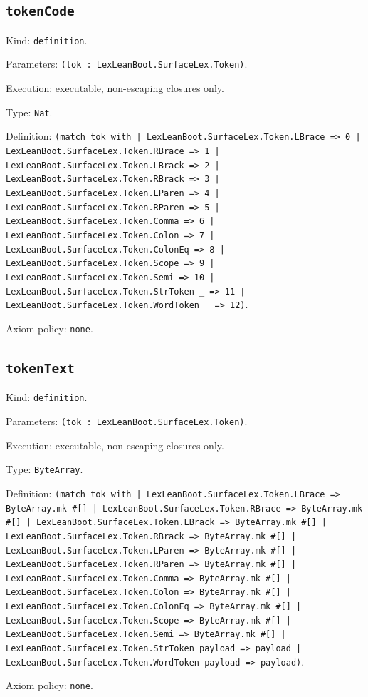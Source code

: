 \documentclass[11pt]{article}
\begin{document}
\subsection*{\texttt{tokenCode}}
\noindent Kind: \texttt{definition}.\par
\noindent Parameters: \texttt{(tok : LexLeanBoot.SurfaceLex.Token)}.\par
\noindent Execution: executable, non-escaping closures only.\par
\noindent Type: \texttt{Nat}.\par
\noindent Definition: \texttt{(match tok with | LexLeanBoot.SurfaceLex.Token.LBrace => 0 | LexLeanBoot.SurfaceLex.Token.RBrace => 1 | LexLeanBoot.SurfaceLex.Token.LBrack => 2 | LexLeanBoot.SurfaceLex.Token.RBrack => 3 | LexLeanBoot.SurfaceLex.Token.LParen => 4 | LexLeanBoot.SurfaceLex.Token.RParen => 5 | LexLeanBoot.SurfaceLex.Token.Comma => 6 | LexLeanBoot.SurfaceLex.Token.Colon => 7 | LexLeanBoot.SurfaceLex.Token.ColonEq => 8 | LexLeanBoot.SurfaceLex.Token.Scope => 9 | LexLeanBoot.SurfaceLex.Token.Semi => 10 | LexLeanBoot.SurfaceLex.Token.StrToken \_ => 11 | LexLeanBoot.SurfaceLex.Token.WordToken \_ => 12)}.\par
\noindent Axiom policy: \texttt{none}.\par
\subsection*{\texttt{tokenText}}
\noindent Kind: \texttt{definition}.\par
\noindent Parameters: \texttt{(tok : LexLeanBoot.SurfaceLex.Token)}.\par
\noindent Execution: executable, non-escaping closures only.\par
\noindent Type: \texttt{ByteArray}.\par
\noindent Definition: \texttt{(match tok with | LexLeanBoot.SurfaceLex.Token.LBrace => ByteArray.mk \#[] | LexLeanBoot.SurfaceLex.Token.RBrace => ByteArray.mk \#[] | LexLeanBoot.SurfaceLex.Token.LBrack => ByteArray.mk \#[] | LexLeanBoot.SurfaceLex.Token.RBrack => ByteArray.mk \#[] | LexLeanBoot.SurfaceLex.Token.LParen => ByteArray.mk \#[] | LexLeanBoot.SurfaceLex.Token.RParen => ByteArray.mk \#[] | LexLeanBoot.SurfaceLex.Token.Comma => ByteArray.mk \#[] | LexLeanBoot.SurfaceLex.Token.Colon => ByteArray.mk \#[] | LexLeanBoot.SurfaceLex.Token.ColonEq => ByteArray.mk \#[] | LexLeanBoot.SurfaceLex.Token.Scope => ByteArray.mk \#[] | LexLeanBoot.SurfaceLex.Token.Semi => ByteArray.mk \#[] | LexLeanBoot.SurfaceLex.Token.StrToken payload => payload | LexLeanBoot.SurfaceLex.Token.WordToken payload => payload)}.\par
\noindent Axiom policy: \texttt{none}.\par
\end{document}
